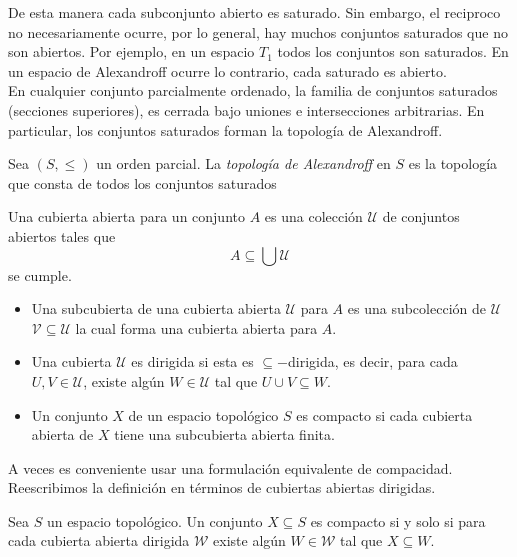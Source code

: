 De esta manera cada subconjunto abierto es saturado. Sin embargo, el reciproco no necesariamente ocurre, por lo general, hay muchos conjuntos saturados que no son abiertos. Por ejemplo, en un espacio $T_1$ todos los conjuntos son saturados. En un espacio de Alexandroff ocurre lo contrario, cada saturado es abierto.\\

En cualquier conjunto parcialmente ordenado, la familia de conjuntos saturados (secciones superiores), es cerrada bajo uniones e intersecciones arbitrarias. En particular, los conjuntos saturados forman la topología de Alexandroff.

\begin{dfn}\label{Alexandroff}
    Sea $(S, \leq)$ un orden parcial. La \emph{topología de Alexandroff} en $S$ es la topología que consta de todos los conjuntos saturados
\end{dfn}

\begin{dfn}
    Una cubierta abierta para un conjunto $A$ es una colección $\mathcal{U}$ de conjuntos abiertos tales que 
    \[
    A\subseteq \bigcup \mathcal{U}
    \]
    se cumple.

    \begin{itemize}
        \item Una subcubierta de una cubierta abierta $\mathcal{U}$ para $A$ es una subcolección de $\mathcal{U}$ $\mathcal{V}\subseteq \mathcal{U}$ la cual forma una cubierta abierta para $A$.
        \item Una cubierta $\mathcal{U}$ es dirigida si esta es $\subseteq-$dirigida, es decir, para cada $U,V\in \mathcal{U}$, existe algún $W\in \mathcal{U}$ tal que $U\cup V\subseteq W$.
        \item Un conjunto $X$ de un espacio topológico $S$ es compacto si cada cubierta abierta de $X$ tiene una subcubierta abierta finita.
    \end{itemize}
\end{dfn}

A veces es conveniente usar una formulación equivalente de compacidad. Reescribimos la definición en términos de cubiertas abiertas dirigidas. 

\begin{lem}
    Sea $S$ un espacio topológico. Un conjunto $X\subseteq S$ es compacto si y solo si para cada cubierta abierta dirigida $\mathcal{W}$ existe algún $W\in \mathcal{W}$ tal que $X\subseteq W$.
\end{lem}

